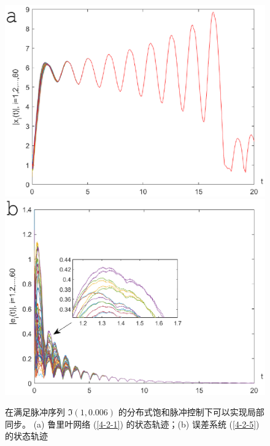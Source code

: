 \begin{figure}[H]
    \centering
    \includegraphics[scale=0.5]{./ch4/fig4-5-1.eps}
    \includegraphics[scale=0.5]{./ch4/fig4-5-2.eps}
   \caption{在满足脉冲序列 $\Im(1,0.006)$ 的分布式饱和脉冲控制下可以实现局部同步。 (a) 鲁里叶网络 (\ref{4-2-1}) 的状态轨迹；(b) 误差系统 (\ref{4-2-5}) 的状态轨迹 } 
      \label{f4-5} 
\end{figure} 

